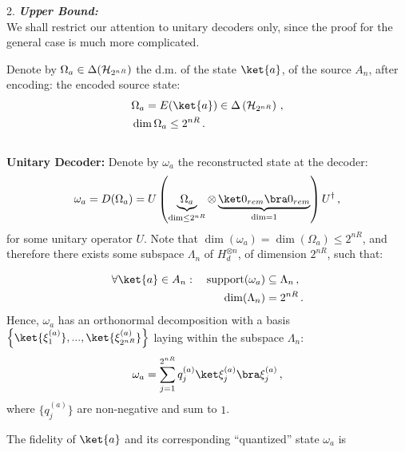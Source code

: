 \documentclass[12pt,a4paper]{article}
\begin{document}
2. \textbf{\emph{Upper Bound:}}\\
        We shall restrict our attention to unitary decoders only, since the
        proof for the general case is much more complicated.  

        Denote by $\Omega_a \in \Delta(\mathcal{H}_{2^{nR}})$ the d.m. of the
        state $\ket{a}$, of the source $A_n$, after encoding:
        the encoded source state:
        \begin{align*}
            &\Omega_a = E(\ket{a}) \in \Delta \left( \cH_{2^{nR}} \right)
            \,, \\
            &\dim \Omega_a \leq 2^{nR} \,.
        \end{align*}
\\
\textbf{Unitary Decoder:}
        Denote by $\omega_a$ the reconstructed state at the decoder:
        \begin{align*}
            \omega_a = D(\Omega_a) = U \left( \underbrace{\Omega_a}_{\dim \leq 2^{nR}} \otimes \underbrace{\ketbra{0_{rem}}}_{\dim = 1} \right)
            U^\dagger \,,
        \end{align*}
        for some unitary operator $U$. Note that $\dim(\omega_a) =
        \dim(\Omega_a) \leq 2^{nR}$, and therefore there exists some
        subspace $\Lambda_n$ of $H_d^{\otimes n}$, of dimension $2^{nR}$,
        such that:

        \begin{align*}
            \forall \ket{a} \in A_n: \quad \text{support} (\omega_a) &\subseteq
            \Lambda_n \,, \\
            \dim(\Lambda_n) &= 2^{nR} \,.
        \end{align*}
        Hence, $\omega_a$ has an orthonormal decomposition with a basis
        $\left\{ \ket{\xi_1^{(a)}}, ..., \ket{\xi_{2^{nR}}^{(a)}} \right\}$
        laying within the subspace $\Lambda_n$:
        \begin{align*}
            \omega_a = \sum_{j=1}^{2^{nR}} q_j^{(a)} \ketbra{\xi_j^{(a)}} \,,
        \end{align*}
        where $\{q_j^{(a)}\}$ are non-negative and sum to $1$.

        The fidelity of $\ket{a}$ and its corresponding ``quantized'' state
        $\omega_a$ is
\end{document}
